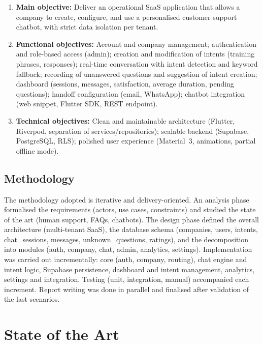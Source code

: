 \documentclass[12pt,a4paper]{report}
\begin{document}
\begin{enumerate}
  \item \textbf{Main objective:} Deliver an operational SaaS application that allows a company to create, configure, and use a personalised customer support chatbot, with strict data isolation per tenant.
  \item \textbf{Functional objectives:} Account and company management; authentication and role-based access (admin); creation and modification of intents (training phrases, responses); real-time conversation with intent detection and keyword fallback; recording of unanswered questions and suggestion of intent creation; dashboard (sessions, messages, satisfaction, average duration, pending questions); handoff configuration (email, WhatsApp); chatbot integration (web snippet, Flutter SDK, REST endpoint).
  \item \textbf{Technical objectives:} Clean and maintainable architecture (Flutter, Riverpod, separation of services/repositories); scalable backend (Supabase, PostgreSQL, RLS); polished user experience (Material~3, animations, partial offline mode).
\end{enumerate}

\section{Methodology}

The methodology adopted is iterative and delivery-oriented. An analysis phase formalised the requirements (actors, use cases, constraints) and studied the state of the art (human support, FAQs, chatbots). The design phase defined the overall architecture (multi-tenant SaaS), the database schema (companies, users, intents, chat\_sessions, messages, unknown\_questions, ratings), and the decomposition into modules (auth, company, chat, admin, analytics, settings). Implementation was carried out incrementally: core (auth, company, routing), chat engine and intent logic, Supabase persistence, dashboard and intent management, analytics, settings and integration. Testing (unit, integration, manual) accompanied each increment. Report writing was done in parallel and finalised after validation of the last scenarios.

\chapter{State of the Art}
\end{document}
